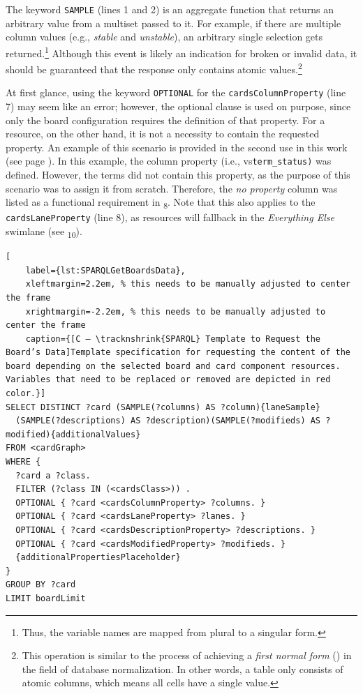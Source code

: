 The keyword \texttt{SAMPLE} (lines 1 and 2) is an aggregate function that returns an arbitrary value from a multiset passed to it. For example, if there are multiple column values (e.g., \textit{stable} and \textit{unstable}), an arbitrary single selection gets returned.\footnote{Thus, the variable names are mapped from plural to a singular form.} Although this event is likely an indication for broken or invalid data, it should be guaranteed that the response only contains atomic values.\footnote{This operation is similar to the process of achieving a \textit{first normal form} (\libertineOsF) in the field of database normalization. In other words, a table only consists of atomic columns, which means all cells have a single value.}

At first glance, using the keyword \texttt{OPTIONAL} for the \texttt{cardsColumnProperty} (line 7) may seem like an error; however, the optional clause is used on purpose, since only the board configuration requires the definition of that property. For a resource, on the other hand, it is not a necessity to contain the requested property. An example of this scenario is provided in the second use in this work (see page \pageref{fig:RMB Use Case 2}). In this example, the column property (i.e., \acrshort{vs}\texttt{term\_status)} was defined. However, the  terms did not contain this property, as the purpose of this scenario was to assign it from scratch. Therefore, the \textit{no property} column was listed as a functional requirement in \textsubscript{8}. Note that this also applies to the \texttt{cardsLaneProperty} (line 8), as resources will fallback in the \textit{Everything Else} swimlane (see \textsubscript{10}).


\begin{spacing}{0.9}
    \lstset{language=SPARQL,escapechar=|}
    \begin{lstlisting}[
    label={lst:SPARQLGetBoardsData},
    xleftmargin=2.2em, % this needs to be manually adjusted to center the frame
    xrightmargin=-2.2em, % this needs to be manually adjusted to center the frame
    caption={[C — \tracknshrink{SPARQL} Template to Request the Board’s Data]Template specification for requesting the content of the board depending on the selected board and card component resources. Variables that need to be replaced or removed are depicted in red color.}]
SELECT DISTINCT ?card (SAMPLE(?columns) AS ?column){laneSample}
  (SAMPLE(?descriptions) AS ?description)(SAMPLE(?modifieds) AS ?modified){additionalValues}
FROM <cardGraph>
WHERE {
  ?card a ?class.
  FILTER (?class IN (<cardsClass>)) .
  OPTIONAL { ?card <cardsColumnProperty> ?columns. }
  OPTIONAL { ?card <cardsLaneProperty> ?lanes. }
  OPTIONAL { ?card <cardsDescriptionProperty> ?descriptions. }
  OPTIONAL { ?card <cardsModifiedProperty> ?modifieds. }
  {additionalPropertiesPlaceholder}
}
GROUP BY ?card
LIMIT boardLimit
\end{lstlisting}
\end{spacing}


